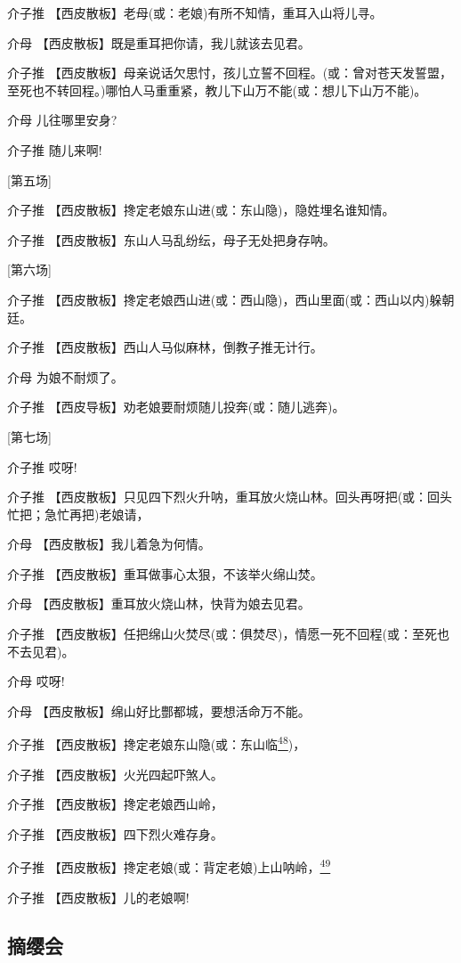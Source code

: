 介子推 【西皮散板】老母(或：老娘)有所不知情，重耳入山将儿寻。

介母 【西皮散板】既是重耳把你请，我儿就该去见君。

介子推
【西皮散板】母亲说话欠思忖，孩儿立誓不回程。(或：曾对苍天发誓盟，至死也不转回程。)哪怕人马重重紧，教儿下山万不能(或：想儿下山万不能)。

介母 儿往哪里安身?

介子推 随儿来啊!

{[}第五场{]}

介子推 【西皮散板】搀定老娘东山进(或：东山隐)，隐姓埋名谁知情。

介子推 【西皮散板】东山人马乱纷纭，母子无处把身存呐。

{[}第六场{]}

介子推
【西皮散板】搀定老娘西山进(或：西山隐)，西山里面(或：西山以内)躲朝廷。

介子推 【西皮散板】西山人马似麻林，倒教子推无计行。

介母 为娘不耐烦了。

介子推 【西皮导板】劝老娘要耐烦随儿投奔(或：随儿逃奔)。

{[}第七场{]}

介子推 哎呀!

介子推
【西皮散板】只见四下烈火升呐，重耳放火烧山林。回头再呀把(或：回头忙把；急忙再把)老娘请，

介母 【西皮散板】我儿着急为何情。

介子推 【西皮散板】重耳做事心太狠，不该举火绵山焚。

介母 【西皮散板】重耳放火烧山林，快背为娘去见君。

介子推
【西皮散板】任把绵山火焚尽(或：俱焚尽)，情愿一死不回程(或：至死也不去见君)。

介母 哎呀!

介母 【西皮散板】绵山好比酆都城，要想活命万不能。

介子推
【西皮散板】搀定老娘东山隐(或：东山临\protect\hyperlink{fn48}{\textsuperscript{48}})，

介子推 【西皮散板】火光四起吓煞人。

介子推 【西皮散板】搀定老娘西山岭，

介子推 【西皮散板】四下烈火难存身。

介子推
【西皮散板】搀定老娘(或：背定老娘)上山呐岭，\protect\hyperlink{fn49}{\textsuperscript{49}}

介子推 【西皮散板】儿的老娘啊!

\newpage
\hypertarget{ux6458ux7f28ux4f1a}{%
\subsection{摘缨会}\label{ux6458ux7f28ux4f1a}}


